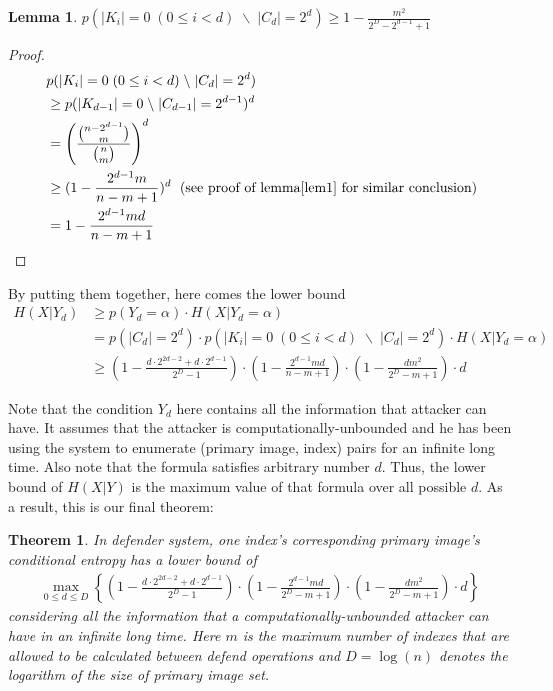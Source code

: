 \documentclass[10pt,a4paper]{article}
\newtheorem{mylemma}{Lemma}
\newtheorem{mytheorem}{Theorem}
\begin{document}
		\begin{mylemma}
			$p(|K_i| = 0	\; (0 \leq i < d) \; \backslash \; |C_d| = 2^d) 
				\geq 1-\frac{m^2}{2^D-2^{d-1}+1}$
		\end{mylemma}
		
		\begin{proof}
			\begin{align*}
				&p(|K_i| = 0	\; (0 \leq i < d) \; \backslash \; |C_d| = 2^d) \\\
					&\geq p(|K_{d-1}| = 0 \; \backslash \; |C_{d-1}| = 2^{d-1})^d\\
					&= \left(\frac{\binom{n-2^{d-1}}{m}}{\binom{n}{m}} \right)^d\\
					&\geq (1-\frac{2^{d-1}m}{n-m+1})^d	\; \text{ (see proof of lemma\ref{lem1} for similar conclusion})\\
					&= 1-\frac{2^{d-1}m d}{n-m+1}
			\end{align*}
		\end{proof}
		
		By putting them together, here comes the lower bound
		\begin{align*}
			H(X | Y_d) &\geq p(Y_d = \alpha) \cdot H(X | Y_d = \alpha)\\
				&= p(|C_d| = 2^d) \cdot p(|K_i| = 0	\; (0 \leq i < d) \; \backslash \; |C_d| = 2^d) \cdot H(X | Y_d = \alpha)\\
				&\geq (1-\frac{d \cdot 2^{2d-2}+d \cdot 2^{d-1}}{2^D-1})
					\cdot (1-\frac{2^{d-1}m d}{n-m+1}) 
					\cdot (1-\frac{dm^2}{2^D-m+1}) \cdot d 
		\end{align*}
		
		Note that the condition $Y_d$ here contains all the
		information that attacker can have. It assumes that
		the attacker is computationally-unbounded and he has
		been using the system to enumerate (primary image, index) pairs
		for an infinite long time. Also note that the formula
		satisfies arbitrary number $d$. Thus, the lower bound
		of $H(X | Y)$ is the maximum value of that formula
		over all possible $d$.
		As a result, this is our final theorem:
		\begin{mytheorem}\label{thm1}
			In defender system, one index's corresponding
			primary image's conditional entropy has a lower bound of
			\begin{align*}
				\max_{0 \leq d \leq D} \left\{ (1-\frac{d \cdot 2^{2d-2}+d \cdot 2^{d-1}}{2^D-1})
					\cdot (1-\frac{2^{d-1}m d}{2^D-m+1}) 
					\cdot (1-\frac{dm^2}{2^D-m+1}) \cdot d  \right\}
			\end{align*}
			considering all the information
			that a computationally-unbounded attacker can
			have in an infinite long time. Here $m$ is
			the maximum number of indexes that are allowed to be calculated
			between defend operations and $D = \log(n)$ denotes the
			logarithm of the size of primary image set.
		\end{mytheorem}
		
\end{document}
